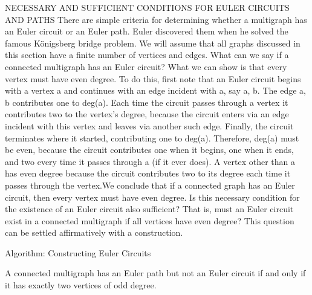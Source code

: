 NECESSARY AND SUFFICIENT CONDITIONS FOR EULER CIRCUITS AND PATHS
There are simple criteria for determining whether a multigraph has an Euler circuit or an Euler
path. Euler discovered them when he solved the famous Königsberg bridge problem. We will
assume that all graphs discussed in this section have a finite number of vertices and edges.
What can we say if a connected multigraph has an Euler circuit? What we can show is that
every vertex must have even degree. To do this, first note that an Euler circuit begins with a
vertex a and continues with an edge incident with a, say {a, b}. The edge {a, b} contributes one
to deg(a). Each time the circuit passes through a vertex it contributes two to the vertex’s degree,
because the circuit enters via an edge incident with this vertex and leaves via another such edge.
Finally, the circuit terminates where it started, contributing one to deg(a). Therefore, deg(a)
must be even, because the circuit contributes one when it begins, one when it ends, and two
every time it passes through a (if it ever does). A vertex other than a has even degree because
the circuit contributes two to its degree each time it passes through the vertex.We conclude that
if a connected graph has an Euler circuit, then every vertex must have even degree.
Is this necessary condition for the existence of an Euler circuit also sufficient? That is, must
an Euler circuit exist in a connected multigraph if all vertices have even degree? This question
can be settled affirmatively with a construction.

Algorithm: Constructing Euler Circuits

\begin{theorem}
A connected multigraph has an Euler path but not an Euler circuit if and only if it has exactly two vertices of odd degree.
\end{theorem}
